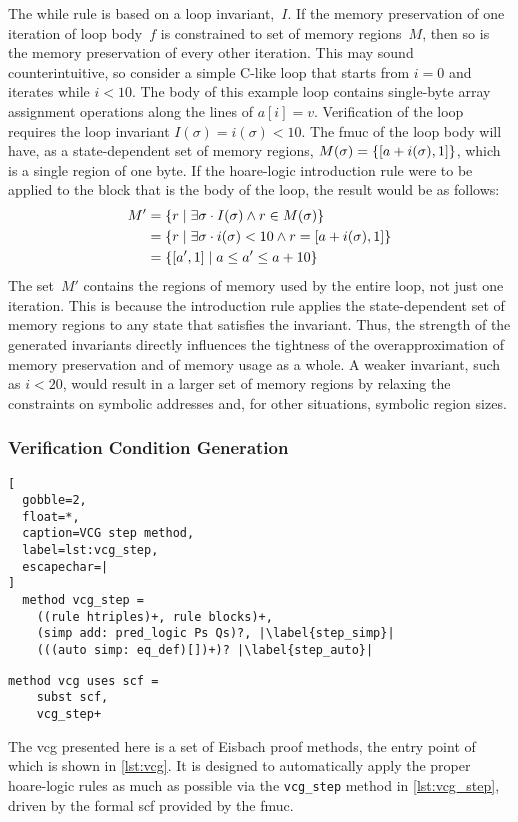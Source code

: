 The while rule is based on a loop invariant,~$I$.
If the memory preservation of one iteration of loop body~$f$
is constrained to set of memory regions~$M$,
then so is the memory preservation of every other iteration.
This may sound counterintuitive,
so consider a simple C-like loop that starts from $i=0$ and iterates while $i<10$.
The body of this example loop contains single-byte array assignment operations
along the lines of $a[i]=v$.
Verification of the loop requires the loop invariant $I(\sigma)=i(\sigma)<10$.
The \ac{fmuc} of the loop body will have, as a state-dependent set of memory regions, $M(\sigma)=\{[a+i(\sigma),1]\}$, which is a single region of one byte.
If the \gls{hoare-logic} introduction rule were to be applied to the block
that is the body of the loop, the result would be as follows:
\begin{subequations}
  \begin{align}
    M' &= \{r\mid\exists\sigma\cdot I(\sigma)\land r\in M(\sigma)\} \\
    &= \{r\mid\exists\sigma\cdot i(\sigma)<10\land r=[a+i(\sigma),1]\} \\
    &= \{[a',1]\mid a\leq a'\le a+10\}
  \end{align}
\end{subequations}
The set~$M'$ contains the regions of memory used by the entire loop,
not just one iteration.
This is because the introduction rule applies the state-dependent set of memory regions
to any state that satisfies the invariant.
Thus, the strength of the generated invariants directly influences
the tightness of the overapproximation of memory preservation
and of memory usage as a whole.
A weaker invariant, such as $i<20$, would result in a larger set of memory regions
by relaxing the constraints on symbolic addresses and,
for other situations, symbolic region sizes.

\subsubsection{Verification Condition Generation}\label{sse:vcg}
\begin{lstlisting}[
  gobble=2,
  float=*,
  caption=VCG step method,
  label=lst:vcg_step,
  escapechar=|
]
  method vcg_step =
    ((rule htriples)+, rule blocks)+,
    (simp add: pred_logic Ps Qs)?, |\label{step_simp}|
    (((auto simp: eq_def)[])+)? |\label{step_auto}|
\end{lstlisting}
\begin{lstlisting}[gobble=2, float=*, caption=Main VCG method, label=lst:vcg]
  method vcg uses scf =
    subst scf,
    vcg_step+
\end{lstlisting}
The \ac{vcg} presented here is a set of Eisbach proof methods,
the entry point of which is shown in \cref{lst:vcg}.
It is designed to automatically apply the proper \gls{hoare-logic} rules
as much as possible via the \lstinline|vcg_step| method in \cref{lst:vcg_step},
driven by the formal \ac{scf} provided by the \ac{fmuc}.


